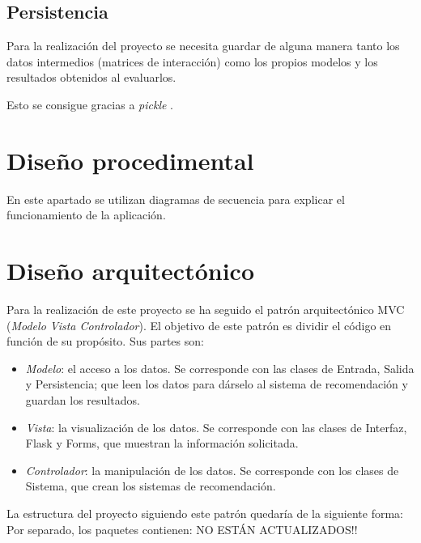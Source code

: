 \subsection{Persistencia}\label{persistencia}
Para la realización del proyecto se necesita guardar de alguna manera tanto los datos intermedios (matrices de interacción) como los propios modelos y los resultados obtenidos al evaluarlos.

Esto se consigue gracias a \textit{pickle} \cite{pickle}.

\section{Diseño procedimental}
En este apartado se utilizan diagramas de secuencia para explicar el funcionamiento de la aplicación.




\section{Diseño arquitectónico}
Para la realización de este proyecto se ha seguido el patrón arquitectónico MVC (\textit{Modelo Vista Controlador}). El objetivo de este patrón es dividir el código en función de su propósito. Sus partes son:
\begin{itemize}
\tightlist
\item \textit{Modelo}: el acceso a los datos. Se corresponde con las clases de Entrada, Salida y Persistencia; que leen los datos para dárselo al sistema de recomendación y guardan los resultados.
\item \textit{Vista}: la visualización de los datos. Se corresponde con las clases de Interfaz, Flask y Forms, que muestran la información solicitada.
\item \textit{Controlador}: la manipulación de los datos. Se corresponde con los clases de Sistema, que crean los sistemas de recomendación.
\end{itemize}


La estructura del proyecto siguiendo este patrón quedaría de la siguiente forma:
Por separado, los paquetes contienen:
NO ESTÁN ACTUALIZADOS!!

